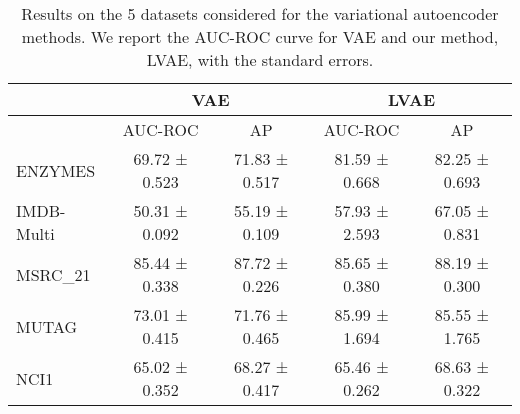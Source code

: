 \begin{table*}[htp]
    \centering
    \begin{tabular}{l|c|c||c|c}
        \toprule
        & \multicolumn{2}{c||}{VAE} & \multicolumn{2}{c}{LVAE} \\
        \midrule
        & AUC-ROC & AP & AUC-ROC & AP \\
        \midrule
        ENZYMES & 69.72 ± 0.523 & 71.83 ± 0.517 & 81.59 ± 0.668 & 82.25 ± 0.693 \\
        IMDB-Multi & 50.31 ± 0.092 & 55.19 ± 0.109 & 57.93 ± 2.593 & 67.05 ± 0.831 \\
        MSRC\_21 & 85.44 ± 0.338 & 87.72 ± 0.226 & 85.65 ± 0.380 & 88.19 ± 0.300 \\
        MUTAG & 73.01 ± 0.415 & 71.76 ± 0.465 & 85.99 ± 1.694 & 85.55 ± 1.765 \\
        NCI1 & 65.02 ± 0.352 & 68.27 ± 0.417 & 65.46 ± 0.262 & 68.63 ± 0.322 \\
        \bottomrule
    \end{tabular}
    \caption{Results on the 5 datasets considered for the variational autoencoder methods. We report the AUC-ROC curve for VAE and our method, LVAE, with the standard errors.}
    \label{tab:lvae:results}
\end{table*}
